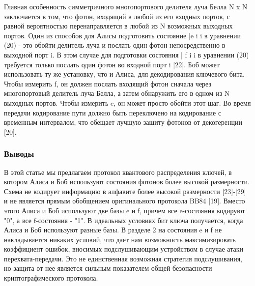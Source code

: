 Главная особенность симметричного многопортового делителя луча Белла N x N заключается в том, что фотон, входящий в любой из его входных портов, с равной вероятностью перенаправляется в любой из N возможных выходных портов. Один из способов для Алисы подготовить состояние |e i i в уравнении (20) - это обойти делитель луча и послать один фотон непосредственно в выходной порт i. В этом случае для подготовки состояния | f i i в уравнении (20) требуется только послать один фотон во входной порт i [22]. Боб может использовать ту же установку, что и Алиса, для декодирования ключевого бита. Чтобы измерить f, он должен послать входящий фотон сначала через многопортовый делитель луча Белла, а затем обнаружить его в одном из N выходных портов. Чтобы измерить e, он может просто обойти этот шаг. Во время передачи кодирование пути должно быть переключено на кодирование с временным интервалом, что обещает лучшую защиту фотонов от декогеренции [20].

\subsubsection{Выводы}

В этой статье мы предлагаем протокол квантового распределения ключей, в котором Алиса и Боб используют состояния фотонов более высокой размерности. Схема не кодирует информацию в алфавите более высокой размерности [23]-[29] и не является прямым обобщением оригинального протокола BB84 [19]. Вместо этого Алиса и Боб используют две базы e и f, причем все e-состояния кодируют "0", а все f-состояния - "1". В идеальных условиях бит ключа получается, когда Алиса и Боб используют разные базы. В разделе 2 на состояния e и f не накладывается никаких условий, что дает нам возможность максимизировать коэффициент ошибок, вносимых подслушивающим устройством в случае атаки перехвата-передачи. Это не единственная возможная стратегия подслушивания, но защита от нее является сильным показателем общей безопасности криптографического протокола.

